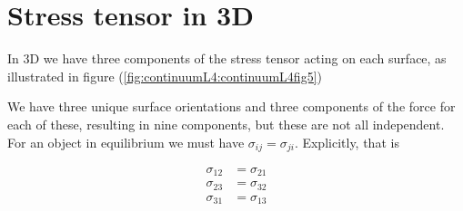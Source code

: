 \section{Stress tensor in 3D}

In 3D we have three components of the stress tensor acting on each surface, as illustrated in figure (\ref{fig:continuumL4:continuumL4fig5})

We have three unique surface orientations and three components of the force for each of these, resulting in nine components, but these are not all independent.  For an object in equilibrium we must have $\sigma_{ij} = \sigma_{ji}$.
Explicitly, that is

\begin{align}\label{eqn:continuumL4:110}
\sigma_{12} &= \sigma_{21} \\
\sigma_{23} &= \sigma_{32} \\
\sigma_{31} &= \sigma_{13}
\end{align}

